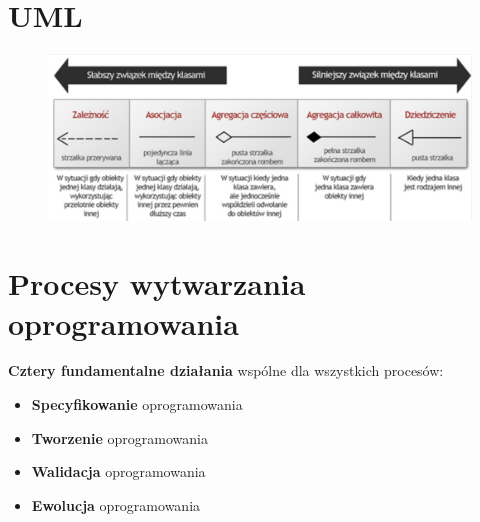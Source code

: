 \documentclass[a4paper]{article}
\begin{document}
    \section {UML}
    \begin{figure}[H]
        \includegraphics[width=\linewidth]{uml_zwiazki.png}
    \end{figure}

    \section{Procesy wytwarzania oprogramowania}
    \textbf{Cztery fundamentalne działania }wspólne dla wszystkich procesów:
    \begin{itemize}
        \item \textbf{Specyfikowanie} oprogramowania
        \item \textbf{Tworzenie} oprogramowania
        \item \textbf{Walidacja} oprogramowania
        \item \textbf{Ewolucja} oprogramowania
    \end{itemize}
\end{document}
